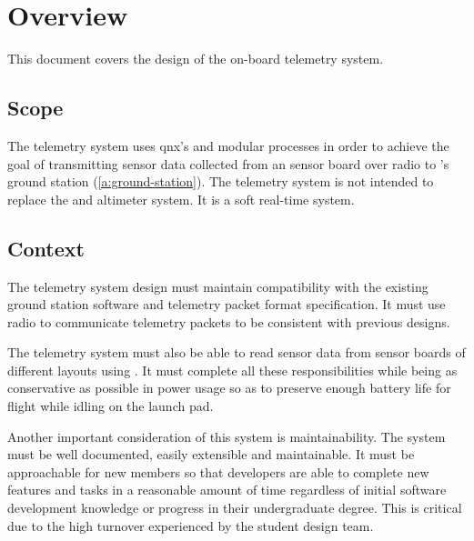 \section{Overview}

This document covers the design of the  on-board telemetry system.

\subsection{Scope}

The telemetry system uses \gls{qnx}'s  and modular processes in order to achieve the goal of
transmitting sensor data collected from an  sensor board over  radio to
's  ground station (\ref{a:ground-station}). The telemetry system is not
intended to replace the   and altimeter system. It is a soft real-time system.

\subsection{Context}

The  telemetry system design must maintain compatibility with the existing ground station
software and telemetry packet format specification. It must use  radio to communicate telemetry
packets to be consistent with previous designs.

The telemetry system must also be able to read sensor data from  sensor boards of different layouts
using . It must complete all these responsibilities while being as conservative as possible in power
usage so as to preserve enough battery life for flight while idling on the launch pad.

Another important consideration of this system is maintainability. The system must be well documented, easily
extensible and maintainable. It must be approachable for new  members so that developers are
able to complete new features and tasks in a reasonable amount of time regardless of initial software development
knowledge or progress in their undergraduate degree. This is critical due to the high turnover experienced by the
student design team.
